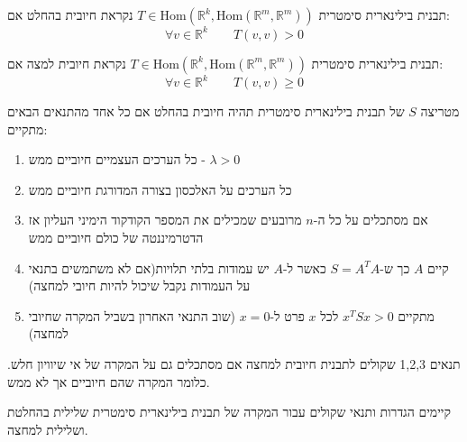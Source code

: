 \documentclass{tstextbook}
\begin{document}
\begin{definition}
תבנית בילינארית סימטרית \(T\in \mathrm{Hom}\left( \mathbb{R}^k ,\mathrm{Hom}\left( \mathbb{R}^m , \mathbb{R}^m\right)\right)\) נקראת חיובית בהחלט אם:
$$\forall v \in \mathbb{R}^k\qquad T(v,v)>0$$

\end{definition}
\begin{definition}
תבנית בילינארית סימטרית \(T\in \mathrm{Hom}\left( \mathbb{R}^k ,\mathrm{Hom}\left( \mathbb{R}^m , \mathbb{R}^m\right)\right)\) נקראת חיובית למצה אם:
$$\forall v \in \mathbb{R}^k\qquad T(v,v)\geq0$$

\end{definition}
\begin{proposition}
מטריצה \(S\) של תבנית בילינארית סימטרית תהיה חיובית בהחלט אם כל אחד מהתנאים הבאים מתקיים:

  \begin{enumerate}
    \item כל הערכים העצמיים חיוביים ממש - \(\lambda>0\)


    \item כל הערכים על האלכסון בצורה המדורגת חיוביים ממש 


    \item אם מסתכלים על כל ה-\(n\) מרובעים שמכילים את המספר הקודקוד הימיני העליון אז הדטרמיננטה של כולם חיוביים ממש 


    \item קיים \(A\) כך ש-\(S=A^TA\) כאשר ל-\(A\) יש עמודות בלתי תלויות(אם לא משתמשים בתנאי על העמודות נקבל שיכול להיות חיובי למחצה) 


    \item מתקיים \(x^T S x>0\) לכל \(x\) פרט ל-\(x=0\) (שוב התנאי האחרון בשביל המקרה שחיובי למחצה) 


  \end{enumerate}
\end{proposition}
\begin{remark}
תנאים 1,2,3 שקולים לתבנית חיובית למחצה אם מסתכלים גם על המקרה של אי שיוויון חלש. כלומר המקרה שהם חיוביים אך לא ממש.

\end{remark}
קיימים הגדרות ותנאי שקולים עבור המקרה של תבנית בילינארית סימטרית שלילית בהחלטת ושלילית למחצה.
\end{document}
